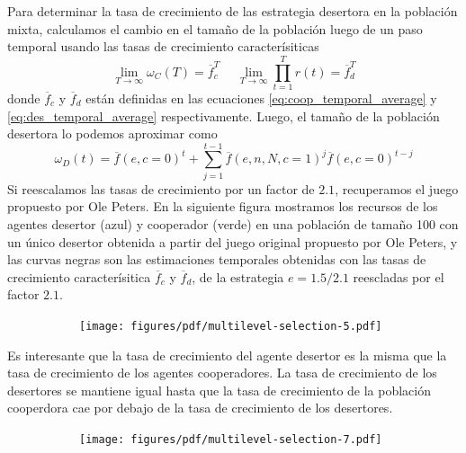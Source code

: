 \documentclass[a4paper,10pt]{article}
\begin{document}

Para determinar la tasa de crecimiento de las estrategia desertora en la población mixta, calculamos el cambio en el tamaño de la población luego de un paso temporal usando las tasas de crecimiento caracterísiticas 
\begin{equation}
\lim_{T \rightarrow \infty} \omega_C(T) = \overline{f}_c^T \ \ \ \  \ \ \lim_{T \rightarrow \infty} \prod^T_{t=1} r(t) = \overline{f}_d^T
\end{equation}
donde $\overline{f}_c$ y $\overline{f}_d$ están definidas en las ecuaciones \ref{eq:coop_temporal_average} y \ref{eq:des_temporal_average} respectivamente.
Luego, el tamaño de la población desertora lo podemos aproximar como 
\begin{equation}
\omega_D(t) = \overline{f}(e,c=0)^t + \sum^{t-1}_{j=1} \overline{f}(e,n,N,c=1)^j \overline{f}(e,c=0)^{t-j}
\end{equation}
Si reescalamos las tasas de crecimiento por un factor de $2.1$, recuperamos el juego propuesto por Ole Peters.
En la siguiente figura mostramos los recursos de los agentes desertor (azul) y cooperador (verde) en una población de tamaño 100 con un único desertor obtenida a partir del juego original propuesto por Ole Peters, y las curvas negras son las estimaciones temporales obtenidas con las tasas de crecimiento caracterísitica $\overline{f}_c$ y $\overline{f}_d$, de la estrategia $e=1.5/2.1$ reescladas por el factor $2.1$.
\begin{figure}[H]
    \centering
    \begin{subfigure}[b]{0.66\textwidth}
    \texttt{[image: figures/pdf/multilevel-selection-5.pdf]}
    \end{subfigure}
    \caption{
    }
    \label{fig:multilevel-selection-5}
\end{figure}
Es interesante que la tasa de crecimiento del agente desertor es la misma que la tasa de crecimiento de los agentes cooperadores.
La tasa de crecimiento de los desertores se mantiene igual hasta que la tasa de crecimiento de la población cooperdora cae por debajo de la tasa de crecimiento de los desertores.
%
\begin{figure}[H]
    \centering
    \begin{subfigure}[b]{0.66\textwidth}
    \texttt{[image: figures/pdf/multilevel-selection-7.pdf]}
    \end{subfigure}
    \caption{
    }
    \label{fig:multilevel-selection-7}
\end{figure}
%
\end{document}
